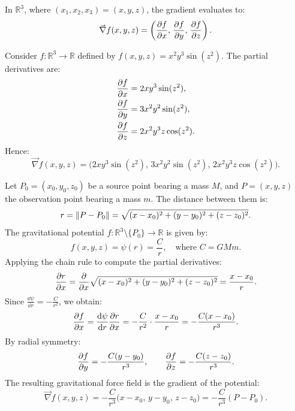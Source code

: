\begin{remarque}
In $\mathbb{R}^3$, where $(x_1, x_2, x_3) = (x, y, z)$, the gradient evaluates to:
\begin{equation}
    \vec{\nabla} f(x, y, z) = \left( \pdv{f}{x}, \, \pdv{f}{y}, \, \pdv{f}{z} \right).
\end{equation}
\end{remarque}

\begin{exemple}
Consider $f : \mathbb{R}^3 \to \mathbb{R}$ defined by $f(x, y, z) = x^2 y^3 \sin(z^2)$. The partial derivatives are:
\begin{align}
    \pdv{f}{x} &= 2x y^3 \sin(z^2), \\
    \pdv{f}{y} &= 3x^2 y^2 \sin(z^2), \\
    \pdv{f}{z} &= 2x^2 y^3 z \cos(z^2).
\end{align}
Hence:
\begin{equation}
    \vec{\nabla} f(x, y, z) = \Big( 2x y^3 \sin(z^2), \, 3x^2 y^2 \sin(z^2), \, 2x^2 y^3 z \cos(z^2) \Big).
\end{equation}
\end{exemple}

\begin{exemple}
Let $P_0 = (x_0, y_0, z_0)$ be a source point bearing a mass $M$, and $P = (x, y, z)$ the observation point bearing a mass $m$. The distance between them is:
\begin{equation}
    r = \left\lVert P - P_0\right\rVert = \sqrt{(x - x_0)^2 + (y - y_0)^2 + (z - z_0)^2}.
\end{equation}
The gravitational potential $f : \mathbb{R}^3 \setminus \{P_0\} \to \mathbb{R}$ is given by:
\begin{equation}
    f(x, y, z) = \psi(r) = \frac{C}{r}, \quad \text{where } C = G M m.
\end{equation}
Applying the chain rule to compute the partial derivatives:
\begin{equation}
    \pdv{r}{x} = \pdv{}{x} \sqrt{(x - x_0)^2 + (y - y_0)^2 + (z - z_0)^2} = \frac{x - x_0}{r}.
\end{equation}
Since $\frac{\dd\psi}{\dd r} = -\frac{C}{r^2}$, we obtain:
\begin{equation}
    \pdv{f}{x} = \frac{\dd\psi}{\dd r} \pdv{r}{x} = -\frac{C}{r^2} \cdot \frac{x - x_0}{r} = -\frac{C(x - x_0)}{r^3}.
\end{equation}
By radial symmetry:
\begin{equation}
    \pdv{f}{y} = -\frac{C(y - y_0)}{r^3}, \qquad \pdv{f}{z} = -\frac{C(z - z_0)}{r^3}.
\end{equation}
The resulting gravitational force field is the gradient of the potential:
\begin{equation}
    \vec{\nabla} f(x, y, z) = -\frac{C}{r^3} \big( x - x_0, \, y - y_0, \, z - z_0 \big) = -\frac{C}{r^3} (P - P_0).
\end{equation}
\end{exemple}

